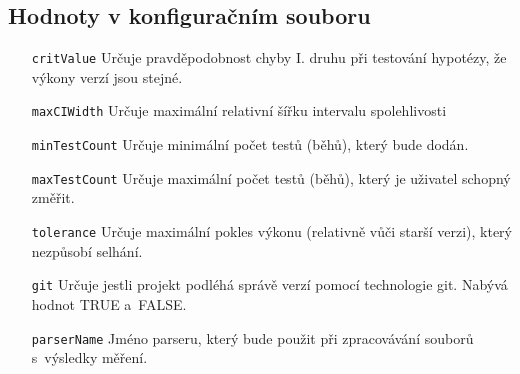\subsection*{Hodnoty v konfiguračním souboru}
\begin{itemize}[label=\texttt{\textbf{\textendash}}]
    \item[\texttt{critValue}]       Určuje pravděpodobnost chyby I. druhu při testování hypotézy, že výkony verzí jsou stejné.
    \item[\texttt{maxCIWidth}]      Určuje maximální relativní šířku intervalu spolehlivosti
    \item[\texttt{minTestCount}]    Určuje minimální počet testů (běhů), který bude dodán.
    \item[\texttt{maxTestCount}]    Určuje maximální počet testů (běhů), který je uživatel schopný změřit.
    \item[\texttt{tolerance}]       Určuje maximální pokles výkonu (relativně vůči starší verzi), který nezpůsobí selhání.
    \item[\texttt{git}]             Určuje jestli projekt podléhá správě verzí pomocí technologie git. Nabývá hodnot TRUE a~FALSE.
    \item[\texttt{parserName}]      Jméno parseru, který bude použit při zpracovávání souborů s~výsledky měření.
\end{itemize}

